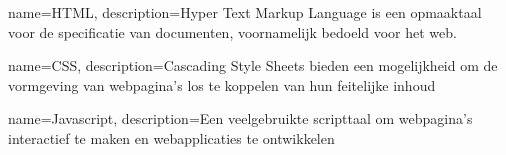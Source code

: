 

\makeglossaries

{
    name=HTML,
    description={Hyper Text Markup Language is een opmaaktaal voor de specificatie van documenten, voornamelijk bedoeld voor het web.}
}

{
    name=CSS,
    description={Cascading Style Sheets bieden een mogelijkheid om de vormgeving van webpagina's los te koppelen van hun feitelijke inhoud}
}

{
    name=Javascript,
    description={Een veelgebruikte scripttaal om webpagina's interactief te maken en webapplicaties te ontwikkelen}
}

